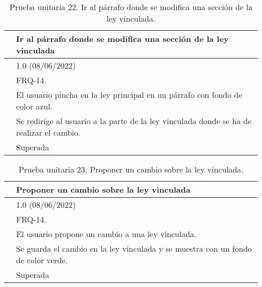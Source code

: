\begin{table}[H]
\begin{center}
\begin{tabular}{|p{3cm}|p{10cm}|} \hline
\centering {\bf PU-22} & Ir al párrafo donde se modifica una sección de la ley vinculada  \\ \hline\hline
\centering {\bf Versión} & 1.0 (08/06/2022) \\ \hline
\centering {\bf Dependencias} & FRQ-14. \\ \hline
\centering {\bf Descripción} &  El usuario pincha en la ley principal en un párrafo con fondo de color azul. \\ \hline
\centering {\bf Criterio de aceptación} & Se redirige al usuario a la parte de la ley vinculada donde se ha de realizar el cambio. \\ \hline
\centering {\bf Estado} & Superada \\ \hline
\end{tabular}
\caption{Prueba unitaria 22. Ir al párrafo donde se modifica una sección de la ley vinculada.}
\label{enlacePU22}
\end{center}
\end{table}

\begin{table}[H]
\begin{center}
\begin{tabular}{|p{3cm}|p{10cm}|} \hline
\centering {\bf PU-23} & Proponer un cambio sobre la ley vinculada  \\ \hline\hline
\centering {\bf Versión} & 1.0 (08/06/2022) \\ \hline
\centering {\bf Dependencias} & FRQ-14. \\ \hline
\centering {\bf Descripción} &  El usuario propone un cambio a una ley vinculada. \\ \hline
\centering {\bf Criterio de aceptación} & Se guarda el cambio en la ley vinculada y se muestra con un fondo de color verde. \\ \hline
\centering {\bf Estado} & Superada \\ \hline
\end{tabular}
\caption{Prueba unitaria 23. Proponer un cambio sobre la ley vinculada.}
\label{enlacePU23}
\end{center}
\end{table}

